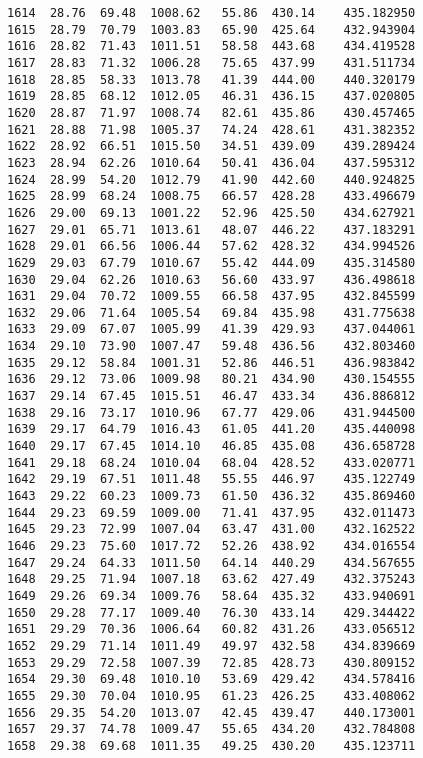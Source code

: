 \documentclass[11pt]{article}
\begin{document}
\begin{tcolorbox}[breakable, size=fbox, boxrule=.5pt, pad at break*=1mm, opacityfill=0]
\begin{Verbatim}[commandchars=\\\{\}]
1614  28.76  69.48  1008.62   55.86  430.14    435.182950
1615  28.79  70.79  1003.83   65.90  425.64    432.943904
1616  28.82  71.43  1011.51   58.58  443.68    434.419528
1617  28.83  71.32  1006.28   75.65  437.99    431.511734
1618  28.85  58.33  1013.78   41.39  444.00    440.320179
1619  28.85  68.12  1012.05   46.31  436.15    437.020805
1620  28.87  71.97  1008.74   82.61  435.86    430.457465
1621  28.88  71.98  1005.37   74.24  428.61    431.382352
1622  28.92  66.51  1015.50   34.51  439.09    439.289424
1623  28.94  62.26  1010.64   50.41  436.04    437.595312
1624  28.99  54.20  1012.79   41.90  442.60    440.924825
1625  28.99  68.24  1008.75   66.57  428.28    433.496679
1626  29.00  69.13  1001.22   52.96  425.50    434.627921
1627  29.01  65.71  1013.61   48.07  446.22    437.183291
1628  29.01  66.56  1006.44   57.62  428.32    434.994526
1629  29.03  67.79  1010.67   55.42  444.09    435.314580
1630  29.04  62.26  1010.63   56.60  433.97    436.498618
1631  29.04  70.72  1009.55   66.58  437.95    432.845599
1632  29.06  71.64  1005.54   69.84  435.98    431.775638
1633  29.09  67.07  1005.99   41.39  429.93    437.044061
1634  29.10  73.90  1007.47   59.48  436.56    432.803460
1635  29.12  58.84  1001.31   52.86  446.51    436.983842
1636  29.12  73.06  1009.98   80.21  434.90    430.154555
1637  29.14  67.45  1015.51   46.47  433.34    436.886812
1638  29.16  73.17  1010.96   67.77  429.06    431.944500
1639  29.17  64.79  1016.43   61.05  441.20    435.440098
1640  29.17  67.45  1014.10   46.85  435.08    436.658728
1641  29.18  68.24  1010.04   68.04  428.52    433.020771
1642  29.19  67.51  1011.48   55.55  446.97    435.122749
1643  29.22  60.23  1009.73   61.50  436.32    435.869460
1644  29.23  69.59  1009.00   71.41  437.95    432.011473
1645  29.23  72.99  1007.04   63.47  431.00    432.162522
1646  29.23  75.60  1017.72   52.26  438.92    434.016554
1647  29.24  64.33  1011.50   64.14  440.29    434.567655
1648  29.25  71.94  1007.18   63.62  427.49    432.375243
1649  29.26  69.34  1009.76   58.64  435.32    433.940691
1650  29.28  77.17  1009.40   76.30  433.14    429.344422
1651  29.29  70.36  1006.64   60.82  431.26    433.056512
1652  29.29  71.14  1011.49   49.97  432.58    434.839669
1653  29.29  72.58  1007.39   72.85  428.73    430.809152
1654  29.30  69.48  1010.10   53.69  429.42    434.578416
1655  29.30  70.04  1010.95   61.23  426.25    433.408062
1656  29.35  54.20  1013.07   42.45  439.47    440.173001
1657  29.37  74.78  1009.47   55.65  434.20    432.784808
1658  29.38  69.68  1011.35   49.25  430.20    435.123711

\end{Verbatim}
\end{tcolorbox}
\end{document}
